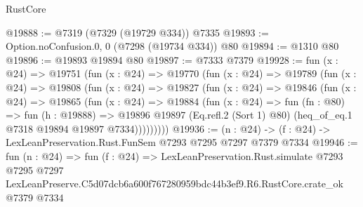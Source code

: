 \begin{lexlean}{RustCore}
\begin{coremodule}
@19888 := @7319 (@7329 (@19729 @334)) @7335
@19893 := Option.noConfusion.{0, 0} (@7298 (@19734 @334)) @80
@19894 := @1310 @80
@19896 := @19893 @19894 @80
@19897 := @7333 @7379
@19928 := fun (x : @24) =>
  @19751
    (fun (x : @24) =>
    @19770
      (fun (x : @24) =>
      @19789
        (fun (x : @24) =>
        @19808
          (fun (x : @24) =>
          @19827
            (fun (x : @24) =>
            @19846
              (fun (x : @24) =>
              @19865
                (fun (x : @24) =>
                @19884
                  (fun (x : @24) =>
                  fun (fn : @80) =>
                  fun (h : @19888) =>
                  @19896
                    @19897
                    (Eq.refl.{2} (Sort 1) @80)
                    (heq_of_eq.{1} @7318 @19894 @19897 @7334)))))))))
@19936 := (n : @24) -> (f : @24) -> LexLeanPreservation.Rust.FunSem @7293 @7295 @7297 @7379 @7334
@19946 := fun (n : @24) =>
  fun (f : @24) =>
  LexLeanPreservation.Rust.simulate
    @7293
    @7295
    @7297
    LexLeanPreserve.C5d07dcb6a600f767280959bdc44b3ef9.R6.RustCore.crate_ok
    @7379
    @7334
\end{coremodule}
\end{lexlean}
